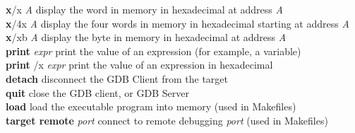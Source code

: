 \documentclass[11pt, twoside, pdftex]{article}
\newcommand{\commonPath}{../../Common}
\begin{document}
\begin{tabbing}
{\bf x}/x {\it A} \>display the word in memory in hexadecimal at address {\it A}\\
{\bf x}/4x {\it A} \>display the four words in memory in hexadecimal starting at address {\it A}\\
{\bf x}/xb {\it A} \>display the byte in memory in hexadecimal at address {\it A}\\
{\bf print} {\it expr} \>print the value of an expression (for example, a variable)\\
{\bf print} /x {\it expr} \>print the value of an expression in hexadecimal\\
{\bf detach} \>disconnect the GDB Client from the target\\
{\bf quit} \>close the GDB client, or GDB Server\\
{\bf load} \>load the executable program into memory (used in Makefiles)\\
{\bf target remote} {\it port} \>connect to remote debugging {\it port} (used in Makefiles)
\end{tabbing}



\end{document}
